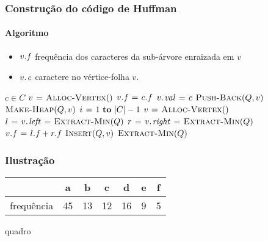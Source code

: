 \documentclass{beamer}
\begin{document}
\begin{frame}
\frametitle{Construção do código de Huffman}
\framesubtitle{Algoritmo}

\begin{itemize}
\item $\attrib{v}{f}$ frequência dos caracteres da sub-árvore enraizada em $v$
\item $\attrib{v}{c}$ caractere no vértice-folha $v$.
\end{itemize}
\begin{small}
\begin{codebox}
\zi {}
\li \For $c \in C$
\li \Do $v \mathrel{\hspace{1pt}=\hspace{1pt}} \textnormal{\scshape Alloc-Vertex}()$
\li   $\attrib{v}{f} \gets \attrib{c}{f}$
\li   $\attrib{v}{val} \gets c$
\li   $\textnormal{\scshape Push-Back}(Q, v)$
    \End
\li $\textnormal{\scshape Make-Heap}(Q, v)$
\li \For $i \gets 1 \To |C|-1$
\li \Do $v \mathrel{\hspace{1pt}=\hspace{1pt}} \textnormal{\scshape Alloc-Vertex}()$
\li   $l \gets \attrib{v}{left} \gets \proc{Extract-Min}(Q)$
\li   $r \gets \attrib{v}{right} \gets \proc{Extract-Min}(Q)$
\li   $\attrib{v}{f} \gets \attrib{l}{f} + \attrib{r}{f}$
\li   $\textnormal{\scshape Insert}(Q, v)$
    \End
\li \Return $\textnormal{\scshape Extract-Min}(Q)$
\end{codebox}
\end{small}
\end{frame}


\begin{frame}
\frametitle{Ilustração}

\begin{center}
\begin{tabular}{r|c|c|c|c|c|c|}
& a & b & c & d & e & f \\
\hline
frequência & 45 & 13 & 12 & 16 & 9 & 5
\end{tabular}
\end{center}

\begin{center}
quadro
\end{center}
\end{frame}
\end{document}

